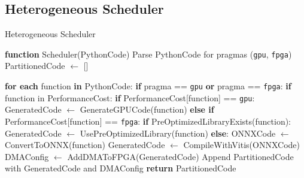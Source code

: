 \documentclass[]{spie}  %
\begin{document}
\subsection{Heterogeneous Scheduler}
\begin{algorithm}[]
\caption{Heterogeneous Scheduler}
\begin{algorithmic}[1]

\STATE \textbf{function} Scheduler(PythonCode)
\STATE \hspace{1em} Parse PythonCode for pragmas (\texttt{gpu}, \texttt{fpga})
\STATE \hspace{1em} PartitionedCode $\leftarrow$ []

\STATE \hspace{1em} \textbf{for each} function \textbf{in} PythonCode:
\STATE \hspace{2em} \textbf{if} pragma == \texttt{gpu} \textbf{or} pragma == \texttt{fpga}:
\STATE \hspace{3em} \textbf{if} function in PerformanceCost:
\STATE \hspace{4em} \textbf{if} PerformanceCost[function] == \texttt{gpu}:
\STATE \hspace{5em} GeneratedCode $\leftarrow$ GenerateGPUCode(function)
\STATE \hspace{4em} \textbf{else if} PerformanceCost[function] == \texttt{fpga}:
\STATE \hspace{5em} \textbf{if} PreOptimizedLibraryExists(function):
\STATE \hspace{6em} GeneratedCode $\leftarrow$ UsePreOptimizedLibrary(function)
\STATE \hspace{5em} \textbf{else}:
\STATE \hspace{6em} ONNXCode $\leftarrow$ ConvertToONNX(function)
\STATE \hspace{6em} GeneratedCode $\leftarrow$ CompileWithVitis(ONNXCode)
\STATE \hspace{5em} DMAConfig $\leftarrow$ AddDMAToFPGA(GeneratedCode)
\STATE \hspace{4em} Append PartitionedCode with GeneratedCode and DMAConfig
\STATE \hspace{1em} \textbf{return} PartitionedCode

\end{algorithmic}
\end{algorithm}
\end{document}
